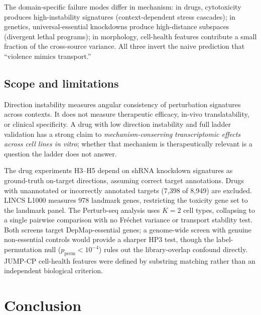 \documentclass{article}
\begin{document}
The domain-specific failure modes differ in mechanism: in drugs, cytotoxicity
produces high-instability signatures (context-dependent stress cascades); in
genetics, universal-essential knockdowns produce high-distance subspaces
(divergent lethal programs); in morphology, cell-health features contribute
a small fraction of the cross-source variance. All three invert the naive
prediction that ``violence mimics transport.''

\subsection{Scope and limitations}

Direction instability measures angular consistency of perturbation signatures
across contexts. It does not measure therapeutic efficacy, in-vivo
translatability, or clinical specificity. A drug with low direction
instability and full ladder validation has a strong claim to
\emph{mechanism-conserving transcriptomic effects across cell lines in
vitro}; whether that mechanism is therapeutically relevant is a question
the ladder does not answer.

The drug experiments H3--H5 depend on shRNA knockdown signatures as
ground-truth on-target directions, assuming correct target annotations.
Drugs with unannotated or incorrectly annotated targets (7{,}398 of
8{,}949) are excluded. LINCS L1000 measures 978 landmark genes,
restricting the toxicity gene set to the landmark panel. The Perturb-seq
analysis uses $K = 2$ cell types, collapsing to a single pairwise
comparison with no Fr\'echet variance or transport stability test.
Both screens target DepMap-essential genes; a genome-wide screen with
genuine non-essential controls would provide a sharper HP3 test, though
the label-permutation null ($p_{\text{perm}} < 10^{-4}$) rules out the
library-overlap confound directly. JUMP-CP cell-health features were
defined by substring matching rather than an independent biological
criterion.

\section{Conclusion}
\end{document}
